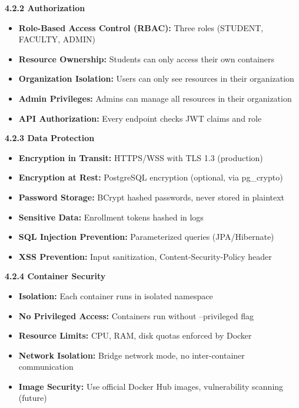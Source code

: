 \documentclass[12pt,a4paper]{article}
\begin{document}
\textbf{4.2.2 Authorization}

\begin{itemize}[noitemsep]
    \item \textbf{Role-Based Access Control (RBAC):} Three roles (STUDENT, FACULTY, ADMIN)
    \item \textbf{Resource Ownership:} Students can only access their own containers
    \item \textbf{Organization Isolation:} Users can only see resources in their organization
    \item \textbf{Admin Privileges:} Admins can manage all resources in their organization
    \item \textbf{API Authorization:} Every endpoint checks JWT claims and role
\end{itemize}

\textbf{4.2.3 Data Protection}

\begin{itemize}[noitemsep]
    \item \textbf{Encryption in Transit:} HTTPS/WSS with TLS 1.3 (production)
    \item \textbf{Encryption at Rest:} PostgreSQL encryption (optional, via pg\_crypto)
    \item \textbf{Password Storage:} BCrypt hashed passwords, never stored in plaintext
    \item \textbf{Sensitive Data:} Enrollment tokens hashed in logs
    \item \textbf{SQL Injection Prevention:} Parameterized queries (JPA/Hibernate)
    \item \textbf{XSS Prevention:} Input sanitization, Content-Security-Policy header
\end{itemize}

\textbf{4.2.4 Container Security}

\begin{itemize}[noitemsep]
    \item \textbf{Isolation:} Each container runs in isolated namespace
    \item \textbf{No Privileged Access:} Containers run without --privileged flag
    \item \textbf{Resource Limits:} CPU, RAM, disk quotas enforced by Docker
    \item \textbf{Network Isolation:} Bridge network mode, no inter-container communication
    \item \textbf{Image Security:} Use official Docker Hub images, vulnerability scanning (future)
\end{itemize}
\end{document}
